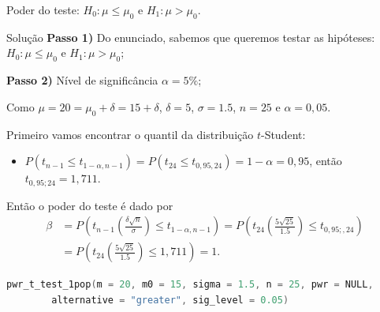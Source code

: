 \documentclass[8pt]{beamer}
\begin{document}
\begin{frame}[fragile]{Poder do teste: $H_0:\mu \leq \mu_0$ e $H_1: \mu > \mu_0$.}

\begin{block}{Solução}
	\textbf{Passo 1)} Do enunciado, sabemos que queremos testar as hipóteses: $H_0: \mu \leq \mu_0$ e $H_1: \mu > \mu_0$;

	\textbf{Passo 2)} Nível de significância $\alpha = 5\%$;
	
	Como $\mu=20=\mu_0 + \delta = 15 + \delta$, $\delta = 5$, $\sigma = 1.5$, $n=25$ e $\alpha=0,05$.
	
	Primeiro vamos encontrar o quantil da distribuição $t$-Student:
	\begin{itemize}
		\item $P\left( t_{n-1} \leq  t_{1-\alpha, n-1} \right) = P\left( t_{24} \leq  t_{0,95, 24} \right) = 1-\alpha = 0,95$, então $t_{0,95; 24} = 1,711$.
	\end{itemize}
	
	Então o poder do teste é dado por
	\begin{align*}
	\beta &= P \left( t_{n-1}\left( \frac{\delta\sqrt{n}}{\sigma}\right) \leq t_{1-\alpha, n-1}  \right) = P \left( t_{24}\left( \frac{5\sqrt{25}}{1.5}\right) \leq t_{0,95;, 24} \right) \\ 
	&= P \left( t_{24}\left( \frac{5\sqrt{25}}{1.5}\right) \leq 1,711 \right) = 1.
	\end{align*}
\end{block}

\begin{lstlisting}[language = C, caption = Código no R.]
pwr_t_test_1pop(m = 20, m0 = 15, sigma = 1.5, n = 25, pwr = NULL,
		alternative = "greater", sig_level = 0.05)
\end{lstlisting}
\end{frame}
\end{document}

